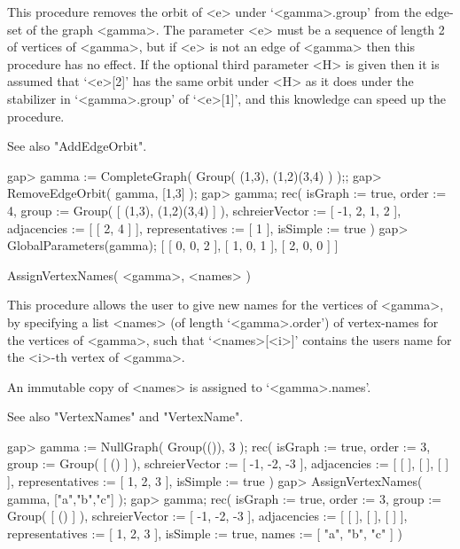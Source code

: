 This procedure removes the orbit of <e> under `<gamma>.group' from the
edge-set of the graph <gamma>. The parameter <e> must be a sequence of
length 2 of vertices of <gamma>, but if <e> is not an edge of <gamma>
then this procedure has no effect. If the optional third parameter <H>
is given then it is assumed that `<e>[2]' has the same orbit under <H>
as it does under the stabilizer in `<gamma>.group' of `<e>[1]', and
this knowledge can speed up the procedure.

See also "AddEdgeOrbit".

\beginexample
gap> gamma := CompleteGraph( Group( (1,3), (1,2)(3,4) ) );;
gap> RemoveEdgeOrbit( gamma, [1,3] );
gap> gamma;
rec(
  isGraph := true,
  order := 4,
  group := Group( [ (1,3), (1,2)(3,4) ] ),
  schreierVector := [ -1, 2, 1, 2 ],
  adjacencies := [ [ 2, 4 ] ],
  representatives := [ 1 ],
  isSimple := true )
gap> GlobalParameters(gamma);
[ [ 0, 0, 2 ], [ 1, 0, 1 ], [ 2, 0, 0 ] ]
\endexample


\>AssignVertexNames( <gamma>, <names> )

This procedure allows the user to give new names for the vertices of
<gamma>, by specifying a list <names> (of length `<gamma>.order') of
vertex-names for the vertices of <gamma>, such that `<names>[<i>]'
contains the user{\pif}s name for the <i>-th vertex of <gamma>.

An immutable copy of <names> is assigned to `<gamma>.names'. 

See also "VertexNames" and "VertexName".

\beginexample
gap> gamma := NullGraph( Group(()), 3 );
rec(
  isGraph := true,
  order := 3,
  group := Group( [ () ] ),
  schreierVector := [ -1, -2, -3 ],
  adjacencies := [ [  ], [  ], [  ] ],
  representatives := [ 1, 2, 3 ],
  isSimple := true )
gap> AssignVertexNames( gamma, ["a","b","c"] );
gap> gamma;
rec(
  isGraph := true,
  order := 3,
  group := Group( [ () ] ),
  schreierVector := [ -1, -2, -3 ],
  adjacencies := [ [  ], [  ], [  ] ],
  representatives := [ 1, 2, 3 ],
  isSimple := true,
  names := [ "a", "b", "c" ] )
\endexample
